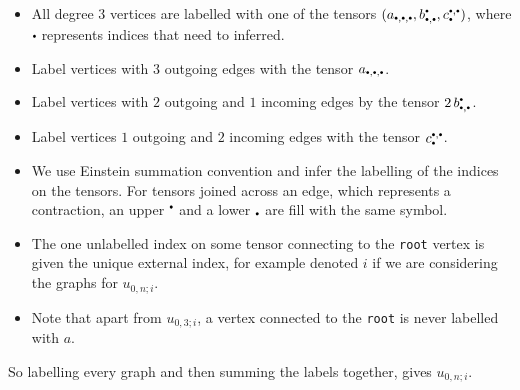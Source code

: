     \begin{itemize}
        \item All degree \(3\) vertices are labelled with one of the tensors \( (a_{\sbt,\sbt,\sbt},b_{\sbt,\sbt}^{\sbt}, c_{\sbt}^{\sbt,\sbt})\), where \( \sbt\) represents indices that need to inferred. 
        \item Label vertices with \(3\) outgoing edges with the tensor  \(a_{\sbt,\sbt,\sbt}\).
        \item  Label vertices with \(2\) outgoing and \(1\) incoming edges by the tensor \(2 \, b_{\sbt,\sbt}^{\sbt}\). 
        \item  Label vertices \(1\) outgoing and \(2\) incoming edges with the tensor \( c_{\sbt}^{\sbt,\sbt}\).
        \item We use Einstein summation convention and infer the labelling of the indices on the tensors. For tensors joined across an edge, which represents a contraction, an upper \({}^{\sbt}\) and a lower \({}_{\sbt}\) are fill with the same symbol. 
        \item The one unlabelled index on some tensor connecting to the \texttt{root} vertex is given the unique external index, for example denoted \(i\) if we are considering the graphs for \( u_{0,n;i}\). 
        \item Note that apart from \( u_{0,3;i}\), a vertex connected to the \texttt{root} is never labelled with \(a\).
    \end{itemize}
    So labelling every graph and then summing the labels together, gives \( u_{0,n;i}\).
    
